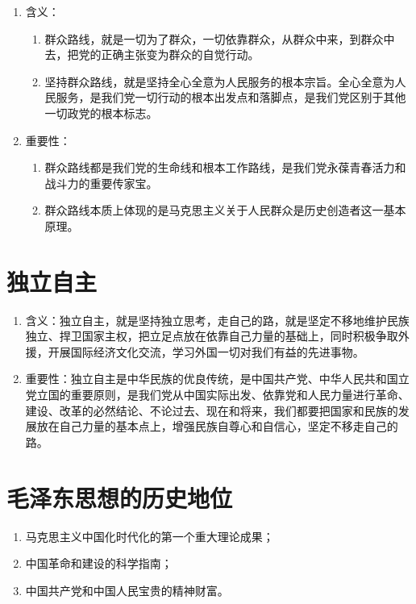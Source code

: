 \documentclass[12pt, a4paper, oneside]{ctexbook}
\begin{document}
\begin{enumerate}[label=（\arabic*）]
\item 含义：
\begin{enumerate}[label=（\roman*）]
\item 群众路线，就是一切为了群众，一切依靠群众，从群众中来，到群众中去，把党的正确主张变为群众的自觉行动。

\item 坚持群众路线，就是坚持全心全意为人民服务的根本宗旨。全心全意为人民服务，是我们党一切行动的根本出发点和落脚点，是我们党区别于其他一切政党的根本标志。
\end{enumerate}

\item 重要性：
\begin{enumerate}[label=（\roman*）]
\item 群众路线都是我们党的生命线和根本工作路线，是我们党永葆青春活力和战斗力的重要传家宝。

\item 群众路线本质上体现的是马克思主义关于人民群众是历史创造者这一基本原理。
\end{enumerate}
\end{enumerate}

\section{独立自主}

\begin{enumerate}[label=（\arabic*）]
\item 含义：独立自主，就是坚持独立思考，走自己的路，就是坚定不移地维护民族独立、捍卫国家主权，把立足点放在依靠自己力量的基础上，同时积极争取外援，开展国际经济文化交流，学习外国一切对我们有益的先进事物。

\item 重要性：独立自主是中华民族的优良传统，是中国共产党、中华人民共和国立党立国的重要原则，是我们党从中国实际出发、依靠党和人民力量进行革命、建设、改革的必然结论、不论过去、现在和将来，我们都要把国家和民族的发展放在自己力量的基本点上，增强民族自尊心和自信心，坚定不移走自己的路。
\end{enumerate}

\section{毛泽东思想的历史地位}

\begin{enumerate}[label=（\arabic*）]
\item 马克思主义中国化时代化的第一个重大理论成果；

\item 中国革命和建设的科学指南；

\item 中国共产党和中国人民宝贵的精神财富。
\end{enumerate}
\end{document}
